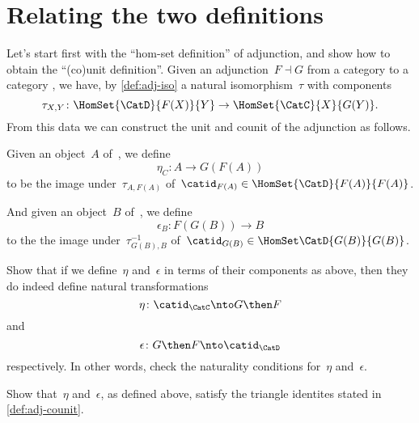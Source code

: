 \section{Relating the two definitions}
\label{relate-adj-defs}

Let's start first with the ``hom-set definition'' of adjunction, and show how to obtain the ``(co)unit definition''.
Given an adjunction~$F \dashv G$ from a category \CatC to a category \CatD, we have, by \cref{def:adj-iso} a natural isomorphism~$\tau$ with components
\begin{equation*}
  \tau_{X,Y} \colon \HomSet{\CatD}{F(X)}{Y} \to \HomSet{\CatC}{X}{G(Y)}.
\end{equation*}
From this data we can construct the unit and counit of the adjunction as follows.

Given an object~$A$ of~\CatC, we define
\begin{equation*}
  \eta_C \colon A \to G(F(A))
\end{equation*}
to be the image under~$\tau_{A, F(A)}$ of~$\catid_{F(A)} \in \HomSet{\CatD}{F (A)}{F(A)}$.

And given an object~$B$ of~\CatD, we define
\begin{equation*}
  \epsilon_B \colon F(G(B)) \to B
\end{equation*}
to the the image under~$\tau_{G(B), B}^{-1}$ of~$\catid_{G(B)} \in \HomSet\CatD{G(B)}{G(B)}$.

\begin{exercise}\label{ex:eta-epsilon}
  Show that if we define~$\eta$ and~$\epsilon$ in terms of their components as above, then they do indeed define natural transformations
  \begin{equation*}
    \eta\colon \catid_{\CatC} \nto G\then F
  \end{equation*}
  and
  \begin{equation*}
    \epsilon\colon G \then F \nto \catid_{\CatD}
  \end{equation*}
  respectively. In other words, check the naturality conditions for~$\eta$ and~$\epsilon$.
\end{exercise}
\begin{solution}
\end{solution}

\begin{exercise}\label{ex:eta-epsilon-triangle}
  Show that~$\eta$ and~$\epsilon$, as defined above, satisfy the triangle identites stated in \cref{def:adj-counit}.
\end{exercise}
\begin{solution}
\end{solution}

